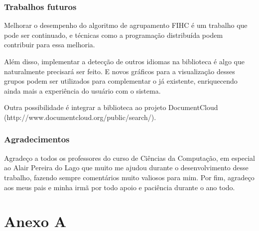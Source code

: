 \documentclass[a4paper,12pt]{article}
\begin{document}
\subsubsection {Trabalhos futuros}
\label {sec:trabalhos_futuros}

Melhorar o desempenho do algoritmo de agrupamento FIHC é um trabalho que pode ser continuado, e técnicas como a programação distribuída podem contribuir para essa melhoria.

Além disso, implementar a detecção de outros idiomas na biblioteca é algo que naturalmente precisará ser feito. E novos gráficos para a visualização desses grupos podem ser utilizados para complementar o já existente, enriquecendo ainda mais a experiência do usuário com o sistema.

Outra possibilidade é integrar a biblioteca ao projeto DocumentCloud (http://www.documentcloud.org/public/search/).

\subsubsection {Agradecimentos}
\label {sec:agradecimentos}

Agradeço a todos os professores do curso de Ciências da Computação, em especial ao Alair Pereira do Lago que muito me ajudou durante o desenvolvimento desse trabalho, fazendo sempre comentários muito valiosos para mim. Por fim, agradeço aos meus pais e minha irmã por todo apoio e paciência durante o ano todo.

\newpage

\section {Anexo A}
\label {sec:anexo_A}
\end{document}
